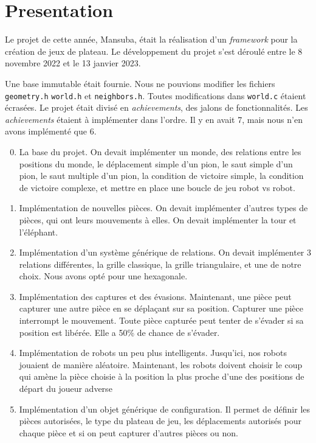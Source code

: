 \section{Presentation}

Le projet de cette année, Mansuba, était la réalisation d'un \emph{framework} pour la création de jeux de plateau.
Le développement du projet s'est déroulé entre le 8 novembre 2022 et le 13 janvier 2023.

Une base immutable était fournie. Nous ne pouvions modifier les fichiers \verb|geometry.h| \verb|world.h| et \verb|neighbors.h|.
Toutes modifications dans \verb|world.c| étaient écrasées.
Le projet était divisé en \emph{achievements}, des jalons de fonctionnalités.
Les \emph{achievements} étaient à implémenter dans l'ordre.
Il y en avait 7, mais nous n'en avons implémenté que 6.

\begin{enumerate}
    \setcounter{enumi}{-1}
    \item La base du projet. On devait implémenter un monde, 
    des relations entre les positions du monde, le déplacement simple d'un pion, 
    le saut simple d'un pion, le saut multiple d'un pion, 
    la condition de victoire simple, la condition de victoire complexe,
    et mettre en place une boucle de jeu robot vs robot.
    \item Implémentation de nouvelles pièces. On devait implémenter d'autres
    types de pièces, qui ont leurs mouvements à elles. On devait implémenter la tour et l'éléphant.
    \item Implémentation d'un système générique de relations. On devait implémenter
    3 relations différentes, la grille classique, la grille triangulaire, et une de notre choix. Nous avons opté pour une hexagonale.
    \item Implémentation des captures et des évasions. Maintenant, une pièce peut capturer une autre pièce
    en se déplaçant sur sa position. Capturer une pièce interrompt le mouvement. Toute pièce capturée
    peut tenter de s'évader si sa position est libérée. Elle a 50\% de chance de s'évader.
    \item Implémentation de robots un peu plus intelligents. Jusqu'ici, nos robots jouaient de manière aléatoire.
    Maintenant, les robots doivent choisir le coup qui amène la pièce choisie à la position la plus proche
    d'une des positions de départ du joueur adverse
    \item Implémentation d'un objet générique de configuration. Il permet de définir 
    les pièces autorisées, le type du plateau de jeu, les déplacements autorisés pour chaque pièce
    et si on peut capturer d'autres pièces ou non. 
\end{enumerate}

